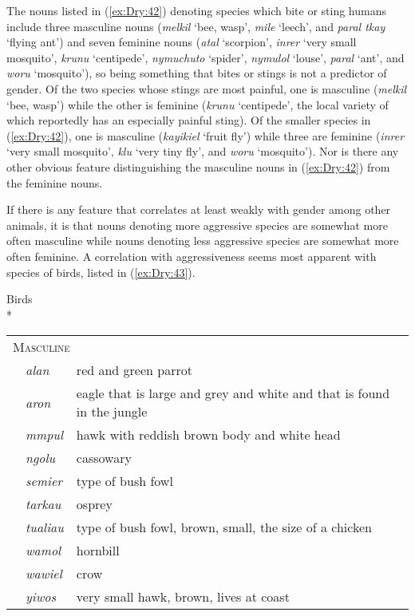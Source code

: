 \documentclass[output=collectionpaper]{langsci/langscibook}
\begin{document}
The nouns listed in (\ref{ex:Dry:42}) denoting species which bite or sting humans include three masculine nouns (\textit{melkil} `bee, wasp', \textit{mile} `leech', and \textit{paral tkay} `flying ant') and seven feminine nouns (\textit{atal} `scorpion', \textit{inrer} `very small mosquito', \textit{krunu} `centipede', \textit{nymuchuto} `spider', \textit{nymulol} `louse', \textit{paral} `ant', and \textit{woru} `mosquito'), so being something that bites or stings is not a predictor of gender. Of the two species whose stings are most painful, one is masculine (\textit{melkil} `bee, wasp') while the other is feminine (\textit{krunu} `centipede', the local variety of which reportedly has an especially painful sting). Of the smaller species in (\ref{ex:Dry:42}), one is masculine (\textit{kayikiel} `fruit fly') while three are feminine (\textit{inrer} `very small mosquito', \textit{klu} `very tiny fly', and \textit{woru} `mosquito'). Nor is there any other obvious feature distinguishing the masculine nouns in (\ref{ex:Dry:42}) from the feminine nouns.

If there is any feature that correlates at least weakly with gender among other  animals, it is that nouns denoting more aggressive species are somewhat more often masculine while nouns denoting less aggressive species are somewhat more often feminine. A correlation with aggressiveness seems most apparent with species of birds, listed in (\ref{ex:Dry:43}).

\ea
\label{ex:Dry:43}
Birds \\*
\begin{tabularx}{0.9\textwidth}{lp{1.8cm}X}
\multicolumn{3}{l}{ \textsc{Masculine}}\\
& \textit{alan} & red and green parrot\\
& \textit{aron} & eagle that is large and grey and white and that is found in the jungle\\
& \textit{mmpul} & hawk with reddish brown body and white head\\
& \textit{ngolu} & cassowary\\
& \textit{semier} & type of bush fowl\\
& \textit{tarkau} & osprey\\
& \textit{tualiau} & type of bush fowl, brown, small, the size of a chicken\\
& \textit{wamol} & hornbill\\
& \textit{wawiel} & crow\\
& \textit{yiwos} & very small hawk, brown, lives at coast\\
\end{tabularx}
\end{document}
